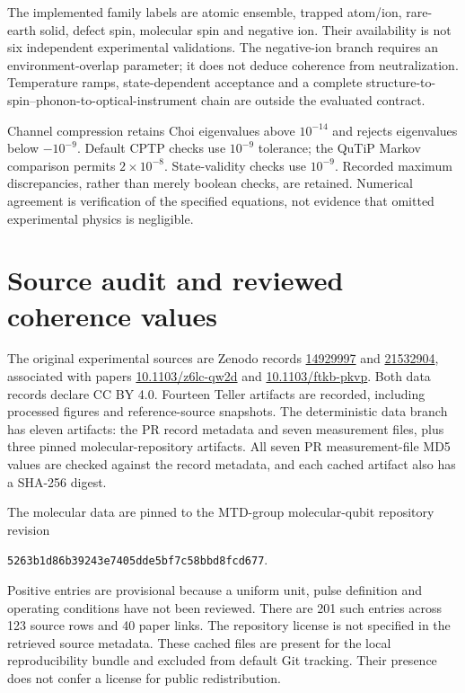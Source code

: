 \documentclass[10pt,a4paper]{article}
\begin{document}
The implemented family labels are atomic ensemble, trapped atom/ion, rare-earth solid, defect spin, molecular spin and negative ion. Their availability is not six independent experimental validations. The negative-ion branch requires an environment-overlap parameter; it does not deduce coherence from neutralization. Temperature ramps, state-dependent acceptance and a complete structure-to-spin--phonon-to-optical-instrument chain are outside the evaluated contract.

Channel compression retains Choi eigenvalues above $10^{-14}$ and rejects eigenvalues below $-10^{-9}$. Default CPTP checks use $10^{-9}$ tolerance; the QuTiP Markov comparison permits $2\times10^{-8}$. State-validity checks use $10^{-9}$. Recorded maximum discrepancies, rather than merely boolean checks, are retained. Numerical agreement is verification of the specified equations, not evidence that omitted experimental physics is negligible.

\section{Source audit and reviewed coherence values}
The original experimental sources are Zenodo records \href{https://doi.org/10.5281/zenodo.14929997}{14929997} and \href{https://doi.org/10.5281/zenodo.21532904}{21532904}, associated with papers \href{https://doi.org/10.1103/z6lc-qw2d}{10.1103/z6lc-qw2d} and \href{https://doi.org/10.1103/ftkb-pkvp}{10.1103/ftkb-pkvp}. Both data records declare CC BY 4.0. Fourteen Teller artifacts are recorded, including processed figures and reference-source snapshots. The deterministic data branch has eleven artifacts: the PR record metadata and seven measurement files, plus three pinned molecular-repository artifacts. All seven PR measurement-file MD5 values are checked against the record metadata, and each cached artifact also has a SHA-256 digest.

The molecular data are pinned to the MTD-group molecular-qubit repository revision
\par\noindent\begin{minipage}{\linewidth}\centering\small\texttt{5263b1d86b39243e7405dde5bf7c58bbd8fcd677}.\end{minipage}\par
Positive entries are provisional because a uniform unit, pulse definition and operating conditions have not been reviewed. There are 201 such entries across 123 source rows and 40 paper links. The repository license is not specified in the retrieved source metadata. These cached files are present for the local reproducibility bundle and excluded from default Git tracking. Their presence does not confer a license for public redistribution.
\end{document}
